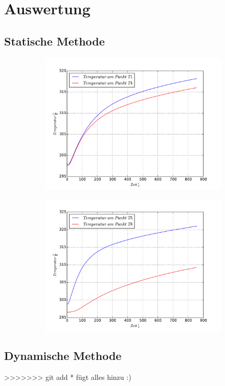 \section{Auswertung}
\label{sec:Auswertung}
\subsection{Statische Methode}

\begin{figure}
  \centering
  \begin{subfigure}{0.48\textwidth}
    \centering
    \includegraphics{plotT1T4}
    \caption{}
    \label{abb:}
    \end{subfigure}
  \begin{subfigure}{0.48\textwidth}
    \centering
    \includegraphics{plotT5T8}
    \caption{}
    \label{abb:}
  \end{subfigure}
  \caption{}
  \label{abb:logos}
\end{figure}




\subsection{Dynamische Methode}
>>>>>>> git add * fügt alles hinzu :)
